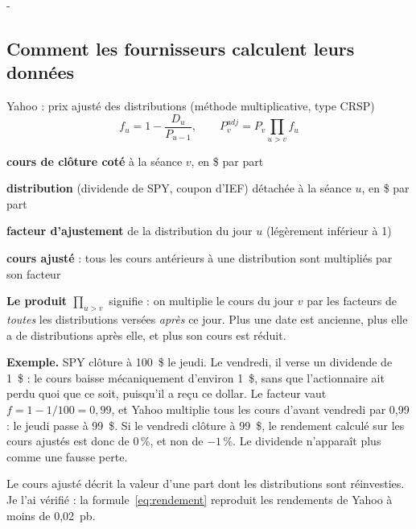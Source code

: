 \documentclass[10pt,a4paper]{article}
\makeatletter
\newcommand{\besoin}[1]{\par\penalty-100\begingroup\setlength{\dimen@}{#1}%
  \dimen@ii\pagegoal\advance\dimen@ii-\pagetotal
  \ifdim\dimen@>\dimen@ii\ifdim\dimen@ii>\z@\vfil\fi\break\fi\endgroup}
\let\soussectionorigine\subsection
\renewcommand{\subsection}{\besoin{5\baselineskip}\soussectionorigine}
\newcommand{\notation}[2]{\makebox[2.3cm][l]{#1}\parbox[t]{\dimexpr\linewidth-2.3cm\relax}{#2}\par}
\makeatother
\begin{document}
\subsection{Comment les fournisseurs calculent leurs données}\label{sec:fournisseurs}
\begin{fournisseur}{Yahoo : prix ajusté des distributions (méthode multiplicative, type CRSP)}
\begin{equation}\label{eq:ajustement}
f_u=1-\frac{D_u}{P_{u-1}},\qquad P^{adj}_v=P_v\prod_{u>v}f_u
\end{equation}
\notation{$P_v$}{\textbf{cours de clôture coté} à la séance $v$, en \$ par part}
\notation{$D_u$}{\textbf{distribution} (dividende de SPY, coupon d'IEF) détachée à la séance $u$, en \$ par part}
\notation{$f_u$}{\textbf{facteur d'ajustement} de la distribution du jour $u$ (légèrement inférieur à 1)}
\notation{$P^{adj}_v$}{\textbf{cours ajusté} : tous les cours antérieurs à une distribution sont multipliés par son facteur}
\textbf{Le produit $\prod_{u>v}$} signifie : on multiplie le cours du jour $v$ par les facteurs de \emph{toutes} les distributions versées \emph{après} ce jour. Plus une date est ancienne, plus elle a de distributions après elle, et plus son cours est réduit.

\textbf{Exemple.} SPY clôture à 100~\$ le jeudi. Le vendredi, il verse un dividende de 1~\$ : le cours baisse mécaniquement d'environ 1~\$, sans que l'actionnaire ait perdu quoi que ce soit, puisqu'il a reçu ce dollar. Le facteur vaut $f=1-1/100=0{,}99$, et Yahoo multiplie tous les cours d'avant vendredi par 0,99 : le jeudi passe à 99~\$. Si le vendredi clôture à 99~\$, le rendement calculé sur les cours ajustés est donc de 0\,\%, et non de $-1\,\%$. Le dividende n'apparaît plus comme une fausse perte.

Le cours ajusté décrit la valeur d'une part dont les distributions sont réinvesties. Je l'ai vérifié : la formule~\eqref{eq:rendement} reproduit les rendements de Yahoo à moins de 0,02~pb.
\end{fournisseur}
\end{document}

